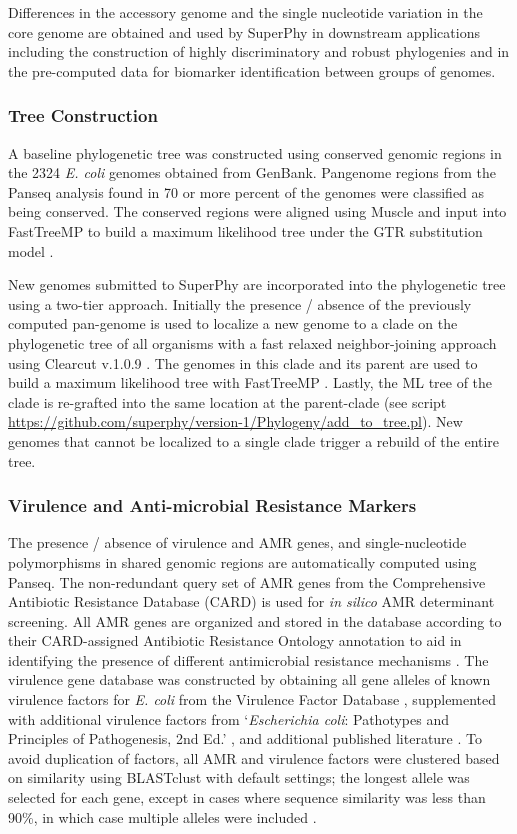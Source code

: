 \documentclass[doublespacing, linenumbers]{bmcart}
\begin{document}
Differences in the accessory genome and the single nucleotide variation in the core genome are obtained and used by SuperPhy in downstream applications including the construction of highly discriminatory and robust phylogenies and in the pre-computed data for biomarker identification between groups of genomes.

\subsubsection{Tree Construction}
A baseline phylogenetic tree was constructed using conserved genomic regions in the 2324 \textit{E. coli} genomes obtained from GenBank. Pangenome regions from the Panseq analysis found in 70 or more percent of the genomes were classified as being conserved. The conserved regions were aligned using Muscle \cite{edgar_muscle_2004,edgar_muscle_2004a} and input into FastTreeMP to build a maximum likelihood tree under the GTR substitution model \cite{price_fasttree_2010}. 

New genomes submitted to SuperPhy are incorporated into the phylogenetic tree using a two-tier approach. Initially the presence / absence of the previously computed pan-genome is used to localize a new genome to a clade on the phylogenetic tree of all organisms with a fast relaxed neighbor-joining approach using Clearcut v.1.0.9 \cite{sheneman_clearcut:_2006}. The genomes in this clade and its parent are used to build a maximum likelihood tree with FastTreeMP \cite{price_fasttree_2010}. Lastly, the ML tree of the clade is re-grafted into the same location at the parent-clade (see script \url{https://github.com/superphy/version-1/Phylogeny/add_to_tree.pl}). New genomes that cannot be localized to a single clade trigger a rebuild of the entire tree.

\subsubsection{Virulence and Anti-microbial Resistance Markers}
The presence / absence of virulence and AMR genes, and single-nucleotide polymorphisms in shared genomic regions are automatically computed using Panseq. The non-redundant query set of AMR genes from the Comprehensive Antibiotic Resistance Database (CARD) \cite{mcarthur_comprehensive_2013} is used for \textit{in silico} AMR determinant screening. All AMR genes are organized and stored in the database according to their CARD-assigned Antibiotic Resistance Ontology annotation to aid in identifying the presence of different antimicrobial resistance mechanisms . The virulence gene database was constructed by obtaining all gene alleles of known virulence factors for \textit{E. coli} from the Virulence Factor Database \cite{chen_vfdb_2011}, supplemented with additional virulence factors from `\textit{Escherichia coli}: Pathotypes and Principles of Pathogenesis, 2nd Ed.' , and additional published literature \cite{donnenberg_escherichia_2013}. To avoid duplication of factors, all AMR and virulence factors were clustered based on similarity using BLASTclust with default settings; the longest allele was selected for each gene, except in cases where sequence similarity was less than 90\%, in which case multiple alleles were included \cite{altschul_gapped_1997}.
\end{document}
